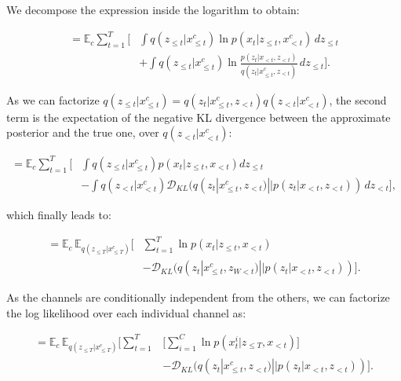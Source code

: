 We decompose the expression inside the logarithm to obtain:

\begin{equation} 
\begin{aligned}
\displaystyle
= \mathbb{E}_c \sum^T_{t=1} \Big[ & \int \mathit{q}(z_{\leq t}|x^c_{\leq t}) \ln \mathit{p}(x_t |z_{\leq t}, x^c_{< t})  \,dz_{\leq t} \\
&+ \int \mathit{q}(z_{\leq t}|x^c_{\leq t}) \ln \frac{\mathit{p}(z_t |x_{< t}, z_{< t})}{\mathit{q}(z_t |x^c_{\leq t}, z_{< t})} \,dz_{\leq t} \Big].
\end{aligned}
\end{equation}

As we can factorize $\mathit{q}(z_{\leq t}|x^c_{\leq t}) = \mathit{q}(z_t |x^c_{\leq t}, z_{< t})\mathit{q}(z_{< t}|x^c_{< t})$, the second term is the expectation of the negative KL divergence between the approximate posterior and the true one, over $\mathit{q}(z_{< t}|x^c_{< t})$:

\begin{equation} 
\begin{aligned}
\displaystyle
= \mathbb{E}_c \sum^T_{t=1} \Big[  & \int \mathit{q}(z_{\leq t}|x^c_{\leq t}) \mathit{p}(x_t |z_{\leq t}, x_{< t}) dz_{\leq t} \\
&- \int \mathit{q}(z_{< t}|x^c_{< t}) \mathcal{D}_{KL}(\mathit{q}(z_t |x^c_{\leq t}, z_{< t}) || \mathit{p}(z_t |x_{< t}, z_{< t})) \,dz_{< t} \Big],
\end{aligned}
\end{equation}

which finally leads to:

\begin{equation} 
\begin{aligned}
\displaystyle
= \mathbb{E}_c \,\mathbb{E}_{\mathit{q}(z_{\leq T}|x^c_{\leq T})}  \Big[ & \sum^T_{t=1} \ln \mathit{p}(x_t |z_{\leq t}, x_{< t}) \\
&- \mathcal{D}_{KL}(\mathit{q}(z_t |x^c_{\leq t}, z_{W< t}) || \mathit{p}(z_t |x_{< t}, z_{< t})) \Big].
\end{aligned}
\end{equation}

As the channels are conditionally independent from the others, we can factorize the log likelihood over each individual channel as:

\begin{equation} 
\begin{aligned} \label{rnn:eq:finalopt}
\displaystyle
= \mathbb{E}_c \,\mathbb{E}_{\mathit{q}(z_{\leq T}|x^c_{\leq T})} \Big[ \sum^T_{t=1} & \Big[ \sum^C_{i=1} \ln \mathit{p}(x^i_t |z_{\leq T}, x_{< t}) \Big] \\
&- \mathcal{D}_{KL}( \mathit{q}(z_t |x^c_{\leq t}, z_{< t}) || \mathit{p}(z_t |x_{< t}, z_{< t})) \Big].
\end{aligned}
\end{equation}

